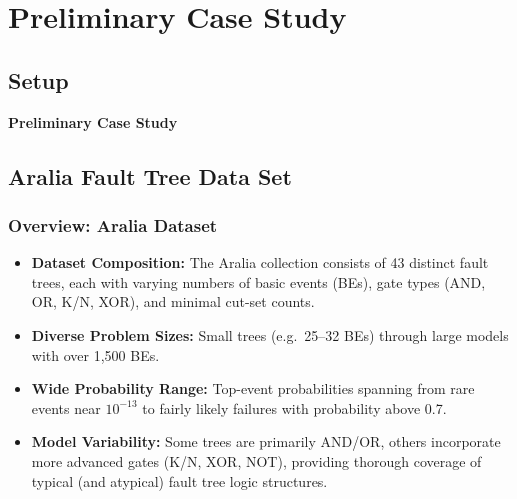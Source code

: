 \section{Preliminary Case Study}
\subsection{Setup}
\begin{frame}
    \Huge{\centerline{\textbf{Preliminary Case Study}}}
\end{frame}

\subsection{Aralia Fault Tree Data Set}
\begin{frame}[t]
\frametitle{Overview: Aralia Dataset}
\begin{itemize}
  \item \textbf{Dataset Composition:} The Aralia collection consists of 43 distinct fault trees, each with varying numbers of basic events (BEs), gate types (AND, OR, K/N, XOR), and minimal cut-set counts.  
  \item \textbf{Diverse Problem Sizes:} Small trees (e.g.\ 25--32 BEs) through large models with over 1{,}500 BEs.  
  \item \textbf{Wide Probability Range:} Top-event probabilities spanning from rare events near \(10^{-13}\) to fairly likely failures with probability above 0.7.  
  \item \textbf{Model Variability:} Some trees are primarily AND/OR, others incorporate more advanced gates (K/N, XOR, NOT), providing thorough coverage of typical (and atypical) fault tree logic structures.
\end{itemize}
\end{frame}

\begin{frame}[allowframebreaks]
    
\end{frame}

